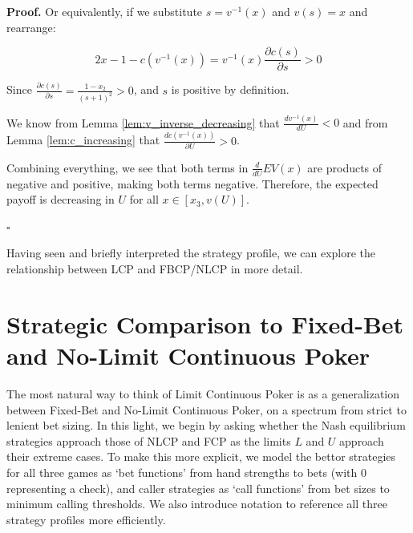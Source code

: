 \documentclass[a4paper,12pt]{article}
\theoremstyle{plain}
\theoremstyle{definition}
\newenvironment{customproof}[1][Proof]{\noindent\textbf{#1.} }{\hfill$\square$\vspace{1em}}
\begin{document}
\begin{customproof}
    Or equivalently, if we substitute $s= v^{-1}(x)$ and $v(s) = x$ and rearrange:

    $$ 2x -1 -c(v^{-1}(x)) = v^{-1}(x) \frac{\partial c(s)}{\partial s} > 0$$

    Since $\frac{\partial c(s)}{\partial s} = \frac{1-x_2}{(s+1)^2} > 0$, and $s$ is positive by definition.

    We know from Lemma \ref{lem:v_inverse_decreasing} that $\frac{d v^{-1}(x)}{d U} < 0$ and from Lemma \ref{lem:c_increasing} that $\frac{d c(v^{-1}(x))}{\partial U} > 0$.

    Combining everything, we see that both terms in $\frac{d}{dU} EV(x)$ are products of negative and positive, making both terms negative. Therefore, the expected payoff is decreasing in $U$ for all $x \in [x_3, v(U)]$.

    

    
    
    
    
    
    

    

\end{customproof}





Having seen and briefly interpreted the strategy profile, we can explore the relationship between LCP and FBCP/NLCP in more detail.


\section{Strategic Comparison to Fixed-Bet and No-Limit Continuous Poker}
The most natural way to think of Limit Continuous Poker is as a generalization between Fixed-Bet and No-Limit Continuous Poker, on a spectrum from strict to lenient bet sizing. In this light, we begin by asking whether the Nash equilibrium strategies approach those of NLCP and FCP as the limits $L$ and $U$ approach their extreme cases. To make this more explicit, we model the bettor strategies for all three games as `bet functions' from hand strengths to bets (with 0 representing a check), and caller strategies as `call functions' from bet sizes to minimum calling thresholds. We also introduce notation to reference all three strategy profiles more efficiently.
\end{document}
